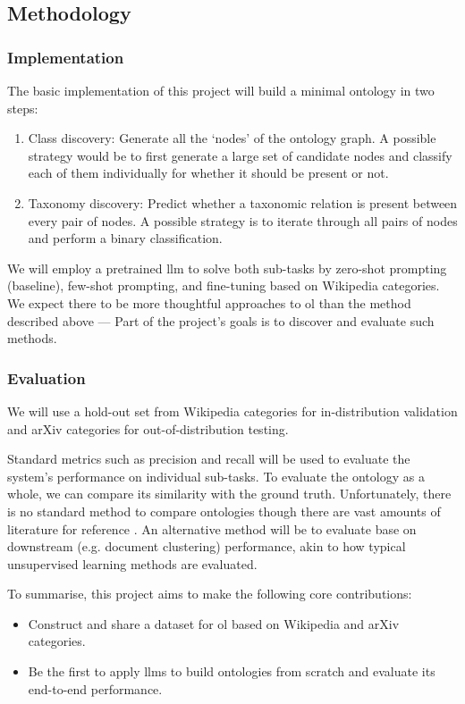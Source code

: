 \subsection*{Methodology}

\subsubsection*{Implementation}

The basic implementation of this project will build a minimal ontology in two steps:
\begin{enumerate}
    \item Class discovery: Generate all the `nodes' of the ontology graph. A possible strategy would be to first generate a large set of candidate nodes and classify each of them individually for whether it should be present or not.
    \item Taxonomy discovery: Predict whether a taxonomic relation is present between every pair of nodes. A possible strategy is to iterate through all pairs of nodes and perform a binary classification.
\end{enumerate}

We will employ a pretrained \gls{llm} to solve both sub-tasks by zero-shot prompting (baseline), few-shot prompting, and fine-tuning based on Wikipedia categories. We expect there to be more thoughtful approaches to \gls{ol} than the method described above --- Part of the project's goals is to discover and evaluate such methods.

\subsubsection*{Evaluation}

We will use a hold-out set from Wikipedia categories for in-distribution validation and arXiv categories for out-of-distribution testing.

Standard metrics such as precision and recall will be used to evaluate the system's performance on individual sub-tasks. To evaluate the ontology as a whole, we can compare its similarity with the ground truth. Unfortunately, there is no standard method to compare ontologies though there are vast amounts of literature for reference \citep{ontology-matching}. An alternative method will be to evaluate base on downstream (e.g. document clustering) performance, akin to how typical unsupervised learning methods are evaluated.

To summarise, this project aims to make the following core contributions:
\begin{itemize}
    \item Construct and share a dataset for \gls{ol} based on Wikipedia and arXiv categories.
    \item Be the first to apply \gls{llm}s to build ontologies from scratch and evaluate its end-to-end performance.
\end{itemize}

